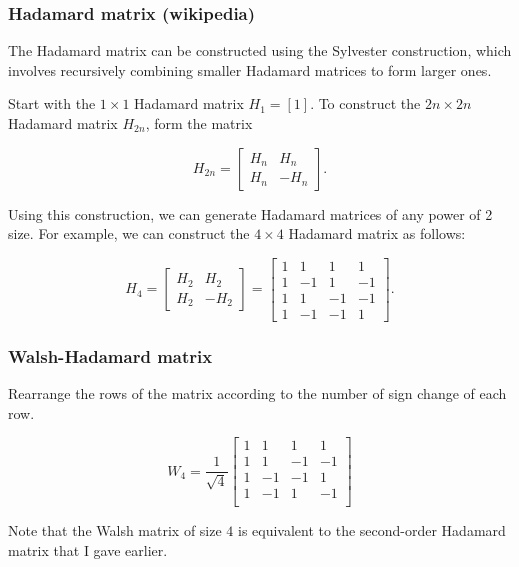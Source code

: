 \begin{frame}
  \frametitle{Hadamard matrix (wikipedia)} 

  The Hadamard matrix can be constructed using the Sylvester construction, which involves recursively combining smaller Hadamard matrices to form larger ones.

Start with the $1 \times 1$ Hadamard matrix $H_1 = [1]$.
To construct the $2n \times 2n$ Hadamard matrix $H_{2n}$, form the matrix

  $$H_{2n} = \begin{bmatrix} H_n & H_n \\ H_n & -H_n \end{bmatrix}.$$

Using this construction, we can generate Hadamard matrices of any power of 2 size. For example, we can construct the $4 \times 4$ Hadamard matrix as follows:

$$H_4 = \begin{bmatrix} H_2 & H_2 \\ H_2 & -H_2 \end{bmatrix} = \begin{bmatrix} 1 & 1 & 1 & 1 \\ 1 & -1 & 1 & -1 \\ 1 & 1 & -1 & -1 \\ 1 & -1 & -1 & 1 \end{bmatrix}.$$

\end{frame}


\begin{frame}
  \frametitle{Walsh-Hadamard matrix }
  Rearrange the rows of the matrix according to the number of sign change of each row.
  

  $$
  W_4 = \frac{1}{\sqrt{4}} \begin{bmatrix}
  1 & 1 & 1 & 1 \\
  1 & 1 & -1 & -1 \\
  1 & -1 & -1 & 1 \\
  1 & -1 & 1 & -1 \\
  \end{bmatrix}
  $$
  
  Note that the Walsh matrix of size $4$ is equivalent to the second-order Hadamard matrix that I gave earlier.

\end{frame}


